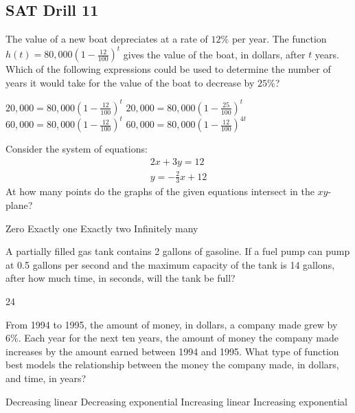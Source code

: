 
\subsection*{SAT Drill 11}

\question[1]
The value of a new boat depreciates at a rate of $12\%$ per year. The function $h(t) = 80,000\left(1-\frac{12}{100}\right)^t$ gives the value of the boat, in dollars, after $t$ years. Which of the following expressions could be used to determine the number of years it would take for the value of the boat to decrease by $25\%$?
\begin{choices}
  \choice $20,000 = 80,000\left(1-\frac{12}{100}\right)^t$
  \choice $20,000 = 80,000\left(1-\frac{25}{100}\right)^t$
  \CorrectChoice $60,000 = 80,000\left(1-\frac{12}{100}\right)^t$
  \choice $60,000 = 80,000\left(1-\frac{12}{100}\right)^{4t}$
\end{choices}

\question[1]
Consider the system of equations:
\[
  \begin{gathered}
  2x + 3y = 12 \\
  y = -\frac{2}{3}x + 12
  \end{gathered}
\]
At how many points do the graphs of the given equations intersect in the $xy$-plane?
\begin{choices}
  \CorrectChoice Zero
  \choice Exactly one
  \choice Exactly two
  \choice Infinitely many
\end{choices}

\question[1]
A partially filled gas tank contains 2 gallons of gasoline. If a fuel pump can pump at 0.5 gallons per second and the maximum capacity of the tank is 14 gallons, after how much time, in seconds, will the tank be full?
\begin{solution}
24
\end{solution}



\newpage



\question[1]
From 1994 to 1995, the amount of money, in dollars, a company made grew by $6\%$. Each year for the next ten years, the amount of money the company made increases by the amount earned between 1994 and 1995. What type of function best models the relationship between the money the company made, in dollars, and time, in years?
\begin{choices}
  \choice Decreasing linear
  \choice Decreasing exponential
  \CorrectChoice Increasing linear
  \choice Increasing exponential
\end{choices}

